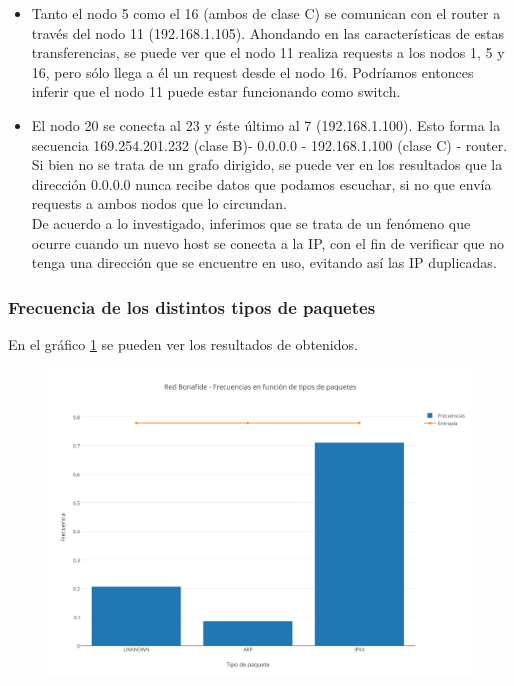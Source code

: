 \begin{itemize}
	\item Tanto el nodo 5 como el 16 (ambos de clase C) se comunican con el router a trav\'es del nodo 11 (192.168.1.105). Ahondando en las caracter\'isticas de estas transferencias, se puede ver que el nodo 11 realiza requests a los nodos 1, 5 y 16, pero s\'olo llega a \'el un request desde el nodo 16. Podr\'iamos entonces inferir que el nodo 11 puede estar funcionando como switch.
	\item El nodo 20 se conecta al 23 y \'este \'ultimo al 7 (192.168.1.100). Esto forma la secuencia 169.254.201.232 (clase B)- 0.0.0.0 - 192.168.1.100 (clase C) - router. Si bien no se trata de un grafo dirigido, se puede ver en los resultados que la direcci\'on 0.0.0.0 nunca recibe datos que podamos escuchar, si no que env\'ia requests a ambos nodos que lo circundan.\\ De acuerdo a lo investigado, inferimos que se trata de un fen\'omeno que ocurre cuando un nuevo host se conecta a la IP, con el fin de verificar que no tenga una direcci\'on que se encuentre en uso, evitando as\'i las IP duplicadas.\\
\end{itemize}


\subsubsection{Frecuencia de los distintos tipos de paquetes}

En el gr\'afico \ref{bonafidePaquetes} se pueden ver los resultados de obtenidos.

\begin{figure}[h!]
    \centering                                                       
    \includegraphics[width=400pt]{img/BonafideFrecuenciaVsTipoPaquetes}
    \caption{}
    \label{bonafidePaquetes}
\end{figure}

